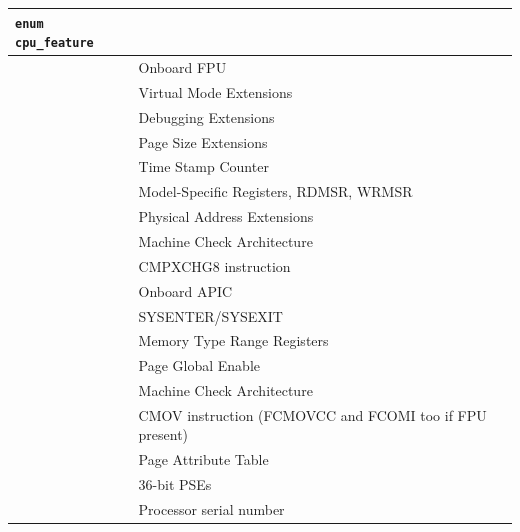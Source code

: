 \vspace{1cm}
\begin{longtable}{|ll|}
\hline
{\tt enum cpu\_feature} & \\
\hline
\hspace{0.5cm}{\tt FPU} &  Onboard FPU  \\
\hspace{0.5cm}{\tt VME} &  Virtual Mode Extensions  \\
\hspace{0.5cm}{\tt DE} &  Debugging Extensions  \\
\hspace{0.5cm}{\tt PSE} &  Page Size Extensions  \\
\hspace{0.5cm}{\tt TSC} &  Time Stamp Counter  \\
\hspace{0.5cm}{\tt MSR} &  Model-Specific Registers, RDMSR, WRMSR  \\
\hspace{0.5cm}{\tt PAE} &  Physical Address Extensions  \\
\hspace{0.5cm}{\tt MCE} &  Machine Check Architecture  \\
\hspace{0.5cm}{\tt CX8} &  CMPXCHG8 instruction  \\
\hspace{0.5cm}{\tt APIC} &  Onboard APIC  \\
\hspace{0.5cm}{\tt SEP} &  SYSENTER/SYSEXIT  \\
\hspace{0.5cm}{\tt MTRR} &  Memory Type Range Registers  \\
\hspace{0.5cm}{\tt PGE} &  Page Global Enable  \\
\hspace{0.5cm}{\tt MCA} &  Machine Check Architecture  \\
\hspace{0.5cm}{\tt CMOV} &  CMOV instruction (FCMOVCC and FCOMI too if FPU present)  \\
\hspace{0.5cm}{\tt PAT} &  Page Attribute Table  \\
\hspace{0.5cm}{\tt PSE36} &  36-bit PSEs  \\
\hspace{0.5cm}{\tt PN} &  Processor serial number  \\

\end{longtable}
